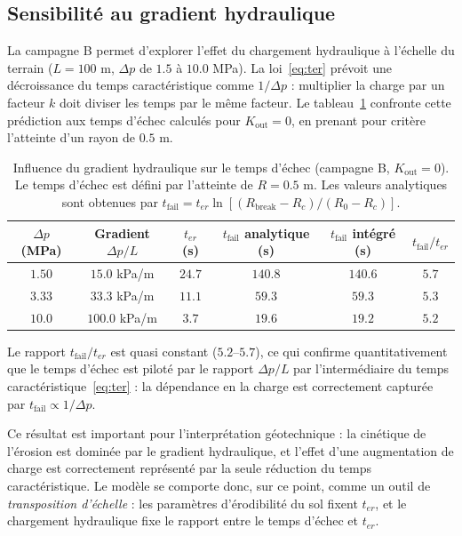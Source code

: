 \documentclass[11pt,a4paper]{report}
\newcommand{\kout}{K_{\mathrm{out}}}
\newcommand{\ter}{{t_{er}}}
\begin{document}
\subsection{Sensibilité au gradient hydraulique}

La campagne B permet d'explorer l'effet du chargement hydraulique à l'échelle du terrain
(\(L = 100\) m, \(\Delta p\) de \(1.5\) à \(10.0\) MPa). La loi~\eqref{eq:ter} prévoit une décroissance du
temps caractéristique comme \(1/\Delta p\) : multiplier la charge par un facteur \(k\) doit diviser les
temps par le même facteur. Le tableau~\ref{tab:gradient} confronte cette prédiction aux temps
d'échec calculés pour \(\kout = 0\), en prenant pour critère l'atteinte d'un rayon de \(0.5\) m.

\begin{table}[H]
\centering
\caption{Influence du gradient hydraulique sur le temps d'échec (campagne B, \(\kout = 0\)). Le temps
d'échec est défini par l'atteinte de \(R = 0.5\) m. Les valeurs analytiques sont obtenues par
\(t_{\mathrm{fail}} = \ter\ln\left[(R_{\mathrm{break}}-R_c)/(R_0-R_c)\right]\).}
\label{tab:gradient}
\small
\begin{tabular}{cccccc}
\toprule
\(\Delta p\) (MPa) & Gradient \(\Delta p/L\) & \(\ter\) (s) & \(t_{\mathrm{fail}}\) analytique (s)
& \(t_{\mathrm{fail}}\) intégré (s) & \(t_{\mathrm{fail}}/\ter\) \\
\midrule
\(1.50\) & \(15.0\) kPa/m & \(24.7\) & \(140.8\) & \(140.6\) & \(5.7\) \\
\(3.33\) & \(33.3\) kPa/m & \(11.1\) & \(59.3\) & \(59.3\) & \(5.3\) \\
\(10.0\) & \(100.0\) kPa/m & \(3.7\) & \(19.6\) & \(19.2\) & \(5.2\) \\
\bottomrule
\end{tabular}
\begin{tablenotes}
\small
\item Le rapport \(t_{\mathrm{fail}}/\ter\) est quasi constant (\(5.2\)--\(5.7\)), ce qui confirme
quantitativement que le temps d'échec est piloté par le rapport \(\Delta p/L\) par l'intermédiaire du temps
caractéristique~\eqref{eq:ter} : la dépendance en la charge est correctement capturée par
\(t_{\mathrm{fail}} \propto 1/\Delta p\).
\end{tablenotes}
\end{table}

Ce résultat est important pour l'interprétation géotechnique : la cinétique de l'érosion est dominée par
le gradient hydraulique, et l'effet d'une augmentation de charge est correctement représenté par la seule
réduction du temps caractéristique. Le modèle se comporte donc, sur ce point, comme un outil de
\emph{transposition d'échelle} : les paramètres d'érodibilité du sol fixent \(\ter\), et le chargement
hydraulique fixe le rapport entre le temps d'échec et \(\ter\).
\end{document}
